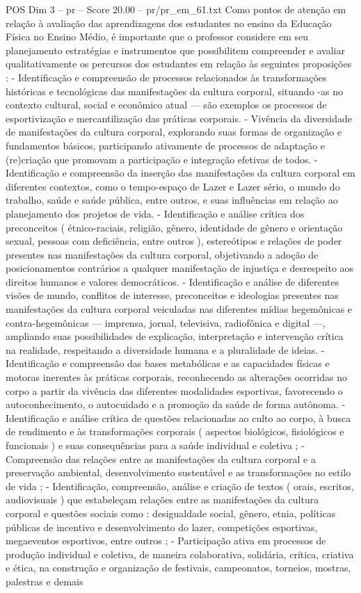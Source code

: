 \begin{textsample}{POS Dim 3 – pr – Score 20.00 – pr/pr\_em\_61.txt}
Como pontos de atenção em relação à avaliação das aprendizagens dos estudantes no ensino da Educação Física no Ensino Médio, é importante que o professor considere em seu planejamento estratégias e instrumentos que possibilitem compreender e avaliar qualitativamente os percursos dos estudantes em relação às seguintes proposições : - Identificação e compreensão de processos relacionados às transformações históricas e tecnológicas das manifestações da cultura corporal, situando -as no contexto cultural, social e econômico atual — são exemplos os processos de esportivização e mercantilização das práticas corporais. - Vivência da diversidade de manifestações da cultura corporal, explorando suas formas de organização e fundamentos básicos, participando ativamente de processos de adaptação e (re)criação que promovam a participação e integração efetivas de todos. - Identificação e compreensão da inserção das manifestações da cultura corporal em diferentes contextos, como o tempo-espaço de Lazer e Lazer sério, o mundo do trabalho, saúde e saúde pública, entre outros, e suas influências em relação ao planejamento dos projetos de vida. - Identificação e análise crítica dos preconceitos ( étnico-raciais, religião, gênero, identidade de gênero e orientação sexual, pessoas com deficiência, entre outros ), estereótipos e relações de poder presentes nas manifestações da cultura corporal, objetivando a adoção de posicionamentos contrários a qualquer manifestação de injustiça e desrespeito aos direitos humanos e valores democráticos. - Identificação e análise de diferentes visões de mundo, conflitos de interesse, preconceitos e ideologias presentes nas manifestações da cultura corporal veiculadas nas diferentes mídias hegemônicas e contra-hegemônicas — imprensa, jornal, televisiva, radiofônica e digital —, ampliando suas possibilidades de explicação, interpretação e intervenção crítica na realidade, respeitando a diversidade humana e a pluralidade de ideias. - Identificação e compreensão das bases metabólicas e as capacidades físicas e motoras inerentes às práticas corporais, reconhecendo as alterações ocorridas no corpo a partir da vivência das diferentes modalidades esportivas, favorecendo o autoconhecimento, o autocuidado e a promoção da saúde de forma autônoma. - Identificação e análise crítica de questões relacionadas ao culto ao corpo, à busca de rendimento e às transformações corporais ( aspectos biológicos, fisiológicos e funcionais ) e suas consequências para a saúde individual e coletiva ; - Compreensão das relações entre as manifestações da cultura corporal e a preservação ambiental, desenvolvimento sustentável e as transformações no estilo de vida ; - Identificação, compreensão, análise e criação de textos ( orais, escritos, audiovisuais ) que estabeleçam relações entre as manifestações da cultura corporal e questões sociais como : desigualdade social, gênero, etnia, políticas públicas de incentivo e desenvolvimento do lazer, competições esportivas, megaeventos esportivos, entre outros ; - Participação ativa em processos de produção individual e coletiva, de maneira colaborativa, solidária, crítica, criativa e ética, na construção e organização de festivais, campeonatos, torneios, mostras, palestras e demais 
\end{textsample}
